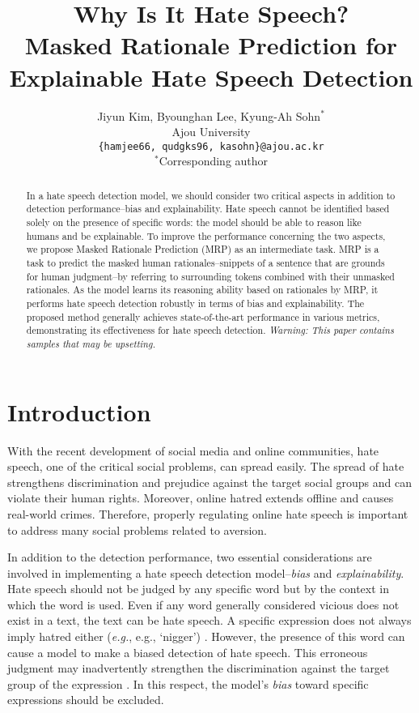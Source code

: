 \documentclass[11pt]{article}
\title{Why Is It Hate Speech? \\Masked Rationale Prediction for Explainable Hate Speech Detection}
\author{Jiyun Kim, Byounghan Lee, Kyung-Ah Sohn\(^{*}\) \\
  Ajou University \\
  \texttt{\{hamjee66, qudgks96, kasohn\}@ajou.ac.kr} \\\(^{*}\)Corresponding author \\
}
\newcommand{\eg}{\textit{e.g.}}
\begin{document}
\maketitle 









\begin{abstract}

In a hate speech detection model, we should consider two critical aspects in addition to detection performance--bias and explainability. Hate speech cannot be identified based solely on the presence of specific words: the model should be able to reason like humans and be explainable. To improve the performance concerning the two aspects, we propose Masked Rationale Prediction (MRP) as an intermediate task. MRP is a task to predict the masked human rationales--snippets of a sentence that are grounds for human judgment--by referring to surrounding tokens combined with their unmasked rationales. As the model learns its reasoning ability based on rationales by MRP, it performs hate speech detection robustly in terms of bias and explainability. The proposed method generally achieves state-of-the-art performance in various metrics, demonstrating its effectiveness for hate speech detection. \textit{Warning: This paper contains samples that may be upsetting.}


\end{abstract}


\section{Introduction}

With the recent development of social media and online communities, hate speech, one of the critical social problems, can spread easily. The spread of hate strengthens discrimination and prejudice against the target social groups and can violate their human rights. Moreover, online hatred extends offline and causes real-world crimes. Therefore, properly regulating online hate speech is important to address many social problems related to aversion.  

In addition to the detection performance, two essential considerations are involved in implementing a hate speech detection model--\textit{bias} and \textit{explainability}. Hate speech should not be judged by any specific word but by the context in which the word is used. Even if any word generally considered vicious does not exist in a text, the text can be hate speech. A specific expression does not always imply hatred either (\eg, e.g., `nigger') \citep{del2017hate}. However, the presence of this word can cause a model to make a biased detection of hate speech. This erroneous judgment may inadvertently strengthen the discrimination against the target group of the expression \citep{sap2019risk, davidson2019racial}. In this respect, the model's \textit{bias} toward specific expressions should be excluded.
\end{document}
